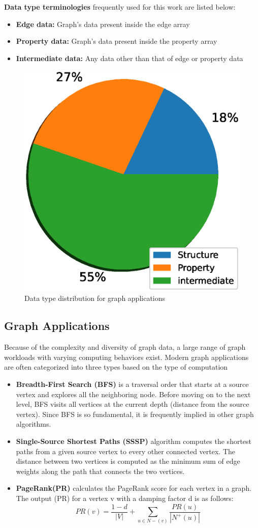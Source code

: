 \documentclass[a4paper,12pt, final]{report}
\begin{document}
\textbf{Data type terminologies} frequently used for this work are listed below:
\begin{itemize}
    \setlength\itemsep{0 em}
    \item \textbf{Edge data:} Graph's data present inside the edge array
    \item \textbf{Property data:} Graph's data present inside the property array
    \item \textbf{Intermediate data:} Any data other than that of edge or property data
\end{itemize}

\begin{figure}[h]
    \centering
    \includegraphics[width=0.4\linewidth]{access_dist.eps}
    \caption{Data type distribution for graph applications}
    \label{fig:my_label}
\end{figure}

\subsection{Graph Applications}
Because of the complexity and diversity of graph data, a large range of graph workloads
with varying computing behaviors exist. Modern graph applications are often categorized
into three types based on the type of computation %

\begin{itemize}
    \setlength\itemsep{0 em}
    \item \textbf{Breadth-First Search (BFS)} is a traversal order that starts at a source vertex
and explores all the neighboring node. Before moving on to the next level, BFS
visits all vertices at the current depth (distance from the source vertex). Since BFS
is so fundamental, it is frequently implied in other graph algorithms.

    \item \textbf{Single-Source Shortest Paths (SSSP)} algorithm computes the shortest paths
from a given source vertex to every other connected vertex. The distance between
two vertices is computed as the minimum sum of edge weights along the path that
connects the two vertices.

    \item \textbf{PageRank(PR)} calculates the PageRank score for each vertex in a graph. The
output (PR) for a vertex v with a damping factor d is as follows:
$$PR(v) = \frac{1-d}{|V|}+\sum_{u\in N-(v)}\frac{PR(u)}{|N^+(u)|}$$
\end{itemize}
\end{document}
